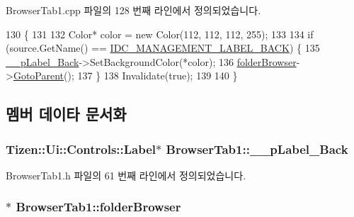 Browser\+Tab1.\+cpp 파일의 128 번째 라인에서 정의되었습니다.


\begin{DoxyCode}
130                                                 \{
131 
132     Color* color = \textcolor{keyword}{new} Color(112, 112, 112, 255);
133 
134     \textcolor{keywordflow}{if} (source.GetName() == \hyperlink{_app_resource_id_8h_a69e9f116d4b974589b52a26093383d51}{IDC\_MANAGEMENT\_LABEL\_BACK}) \{
135         \hyperlink{class_browser_tab1_ad072e2bcaa2a03d684ddfddd0d8dea77}{\_\_pLabel\_Back}->SetBackgroundColor(*color);
136         \hyperlink{class_browser_tab1_a2a514b5068c1222055a103c67abeeb2a}{folderBrowser}->\hyperlink{class_folder_browser_a696779b24f262b38abc391da85d6da37}{GotoParent}();
137     \}
138     Invalidate(\textcolor{keyword}{true});
139 
140 \}
\end{DoxyCode}


\subsection{멤버 데이타 문서화}
\hypertarget{class_browser_tab1_ad072e2bcaa2a03d684ddfddd0d8dea77}{
\subsubsection[{\+\_\+\+\_\+p\+Label\+\_\+\+Back}]{\setlength{\rightskip}{0pt plus 5cm}Tizen\+::\+Ui\+::\+Controls\+::\+Label$\ast$ Browser\+Tab1\+::\+\_\+\+\_\+p\+Label\+\_\+\+Back\hspace{0.3cm}{\ttfamily [private]}}}\label{class_browser_tab1_ad072e2bcaa2a03d684ddfddd0d8dea77}


Browser\+Tab1.\+h 파일의 61 번째 라인에서 정의되었습니다.

\hypertarget{class_browser_tab1_a2a514b5068c1222055a103c67abeeb2a}{
\subsubsection[{folder\+Browser}]{$\ast$ Browser\+Tab1\+::folder\+Browser\hspace{0.3cm}{\ttfamily [private]}}}\label{class_browser_tab1_a2a514b5068c1222055a103c67abeeb2a}


